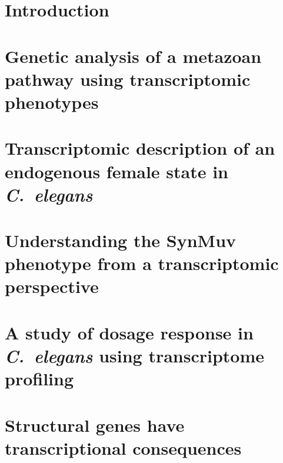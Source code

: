\documentclass[12pt]{caltech_thesis}
\newcommand{\cel}{\emph{C.~elegans}}
\begin{document}
\tableofcontents
\listoffigures
\listoftables
\printnomenclature{}

\mainmatter{}

\chapter{Introduction}
\begin{refsection}
  
  \printbibliography[heading=subbibliography]
\end{refsection}

\chapter{Genetic analysis of a metazoan pathway using transcriptomic phenotypes}
\begin{refsection}
  
  \printbibliography[heading=subbibliography]
\end{refsection}

\chapter{Transcriptomic description of an endogenous female state in \cel{}}
\begin{refsection}
  
  \printbibliography[heading=subbibliography]
\end{refsection}

\chapter{Understanding the SynMuv phenotype from a transcriptomic perspective}
\begin{refsection}
\end{refsection}

\chapter{A study of dosage response in \cel{} using transcriptome profiling}
\begin{refsection}
\end{refsection}

\chapter{Structural genes have transcriptional consequences}
\begin{refsection}
\end{refsection}
\end{document}
